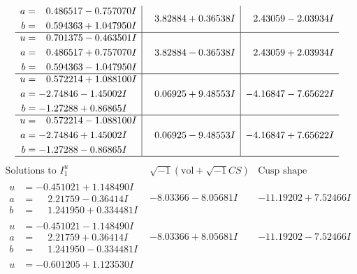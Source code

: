 \documentclass[1p]{elsarticle_modified}
\theoremstyle{definition}
\newcommand{\I}{\sqrt{-1}}
\begin{document}
$$\begin{array}{c|c|c}
\begin{aligned}
a &= \phantom{-}0.486517 - 0.757070 I \\
b &= \phantom{-}0.594363 + 1.047950 I\end{aligned}
 & \phantom{-}3.82884 + 0.36538 I & \phantom{-}2.43059 - 2.03934 I \\ \hline\begin{aligned}
u &= \phantom{-}0.701375 - 0.463501 I \\
a &= \phantom{-}0.486517 + 0.757070 I \\
b &= \phantom{-}0.594363 - 1.047950 I\end{aligned}
 & \phantom{-}3.82884 - 0.36538 I & \phantom{-}2.43059 + 2.03934 I \\ \hline\begin{aligned}
u &= \phantom{-}0.572214 + 1.088100 I \\
a &= -2.74846 - 1.45002 I \\
b &= -1.27288 + 0.86865 I\end{aligned}
 & \phantom{-}0.06925 + 9.48553 I & -4.16847 - 7.65622 I \\ \hline\begin{aligned}
u &= \phantom{-}0.572214 - 1.088100 I \\
a &= -2.74846 + 1.45002 I \\
b &= -1.27288 - 0.86865 I\end{aligned}
 & \phantom{-}0.06925 - 9.48553 I & -4.16847 + 7.65622 I\\
 \hline 
 \end{array}$$\newpage$$\begin{array}{c|c|c}  
\text{Solutions to }I^u_{1}& \I (\text{vol} + \sqrt{-1}CS) & \text{Cusp shape}\\
 \hline 
\begin{aligned}
u &= -0.451021 + 1.148490 I \\
a &= \phantom{-}2.21759 - 0.36414 I \\
b &= \phantom{-}1.241950 + 0.334481 I\end{aligned}
 & -8.03366 - 8.05681 I & -11.19202 + 7.52466 I \\ \hline\begin{aligned}
u &= -0.451021 - 1.148490 I \\
a &= \phantom{-}2.21759 + 0.36414 I \\
b &= \phantom{-}1.241950 - 0.334481 I\end{aligned}
 & -8.03366 + 8.05681 I & -11.19202 - 7.52466 I \\ \hline\begin{aligned}
u &= -0.601205 + 1.123530 I \\

\end{aligned}
\end{array}$$
\end{document}
